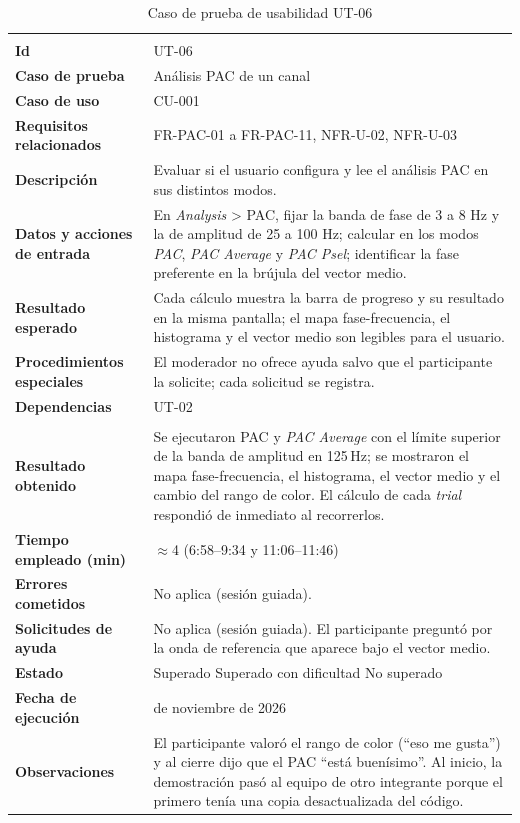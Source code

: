 \documentclass[12pt,letterpaper,oneside]{article}
\DeclareRobustCommand{\_}{\textunderscore\allowbreak}
\newcommand{\fechasesion}{12 de noviembre de 2026}
\newcommand{\casilla}[1]{%
    \fbox{\makebox[1em][c]{#1}}%
}
\begin{document}
\begin{center}
\small
\begin{longtable}{|>{\raggedright\arraybackslash}p{}|>{\raggedright\arraybackslash}p{}|}
\hline
\endfirsthead
\hline
\endhead
\hline
\endfoot
\hline
\caption{Caso de prueba de usabilidad UT-06} \label{tab:ut-06} \\
\endlastfoot
\textbf{Id} & UT-06 \\
\hline
\textbf{Caso de prueba} & Análisis PAC de un canal \\
\hline
\textbf{Caso de uso} & CU-001 \\
\hline
\textbf{Requisitos relacionados} & FR-PAC-01 a FR-PAC-11, NFR-U-02, NFR-U-03 \\
\hline
\textbf{Descripción} & Evaluar si el usuario configura y lee el análisis PAC en sus distintos modos. \\
\hline
\textbf{Datos y acciones de entrada} & En \textit{Analysis} > PAC, fijar la banda de fase de 3 a 8 Hz y la de amplitud de 25 a 100 Hz; calcular en los modos \textit{PAC}, \textit{PAC Average} y \textit{PAC Psel}; identificar la fase preferente en la brújula del vector medio. \\
\hline
\textbf{Resultado esperado} & Cada cálculo muestra la barra de progreso y su resultado en la misma pantalla; el mapa fase-frecuencia, el histograma y el vector medio son legibles para el usuario. \\
\hline
\textbf{Procedimientos especiales} & El moderador no ofrece ayuda salvo que el participante la solicite; cada solicitud se registra. \\
\hline
\textbf{Dependencias} & UT-02 \\
\hline
\multicolumn{2}{|c|}{\textbf{Información para el seguimiento}} \\
\hline
\textbf{Resultado obtenido} & Se ejecutaron PAC y \textit{PAC Average} con el límite superior de la banda de amplitud en 125\,Hz; se mostraron el mapa fase-frecuencia, el histograma, el vector medio y el cambio del rango de color. El cálculo de cada \textit{trial} respondió de inmediato al recorrerlos. \\
\hline
\textbf{Tiempo empleado (min)} & $\approx$4 (6:58--9:34 y 11:06--11:46) \\
\hline
\textbf{Errores cometidos} & No aplica (sesión guiada). \\
\hline
\textbf{Solicitudes de ayuda} & No aplica (sesión guiada). El participante preguntó por la onda de referencia que aparece bajo el vector medio. \\
\hline
\textbf{Estado} & \casilla{x} Superado \qquad \casilla{} Superado con dificultad \qquad \casilla{} No superado \\
\hline
\textbf{Fecha de ejecución} & \fechasesion \\
\hline
\textbf{Observaciones} & El participante valoró el rango de color (``eso me gusta'') y al cierre dijo que el PAC ``está buenísimo''. Al inicio, la demostración pasó al equipo de otro integrante porque el primero tenía una copia desactualizada del código. \\
\hline
\end{longtable}
\end{center}
\end{document}
